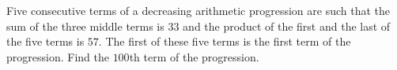 Five consecutive terms of a decreasing arithmetic progression are such that the sum of the three middle terms is $33$ and the product of the first and the last of the five terms is $57$. The first of these five terms is the first term of the progression. Find the $100$th term of the progression.
